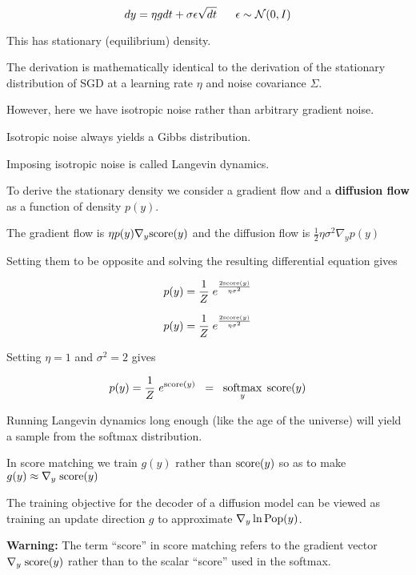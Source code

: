 {

$$dy =  \eta g dt + \sigma \epsilon \sqrt{dt}\;\;\;\;\;\; \epsilon \sim {\cal N}(0,I)$$

\vfill
This has stationary (equilibrium) density.

\vfill
The derivation is mathematically identical to the derivation of the stationary distribution of SGD at a learning rate $\eta$ and noise covariance $\Sigma$.

\vfill
However, here we have isotropic noise rather than arbitrary gradient noise.

\vfill
Isotropic noise always yields a Gibbs distribution.

\vfill
Imposing isotropic noise is called Langevin dynamics.



To derive the stationary density we consider a gradient flow and a {\bf diffusion flow} as a function of density $p(y)$.

\vfill
The gradient flow is $\eta p(y) \nabla_y \mathrm{score}(y)$ and the diffusion flow is $\frac{1}{2}\eta\sigma^2 \nabla_y p(y)$

\vfill
Setting them to be opposite and solving the resulting differential equation gives

\vfill
$$p(y)  = \frac{1}{Z}\;e^{\frac{2\mathrm{score}(y)}{\eta\sigma^2}}$$



$$p(y)  = \frac{1}{Z}\;e^{\frac{2\mathrm{score}(y)}{\eta\sigma^2}}$$

\vfill
Setting $\eta = 1$ and $\sigma^2 = 2$ gives

\vfill
$$p(y)  = \frac{1}{Z}\;e^{\mathrm{score}(y)} \;\;= \;\;\operatorname*{softmax}_y\;\mathrm{score}(y)$$

\vfill
Running Langevin dynamics long enough (like the age of the universe) will yield a sample from the softmax distribution.


In score matching we train $g(y)$ rather than $\mathrm{score}(y)$ so as to make $g(y) \approx \nabla_y \;\mathrm{score}(y)$

\vfill
The training objective for the decoder of a diffusion model can be viewed as training an update direction $g$
to approximate $\nabla_y \ln \mathrm{Pop}(y)$.

\vfill
{\bf Warning:} The term ``score'' in score matching refers to the gradient vector $\nabla_y\; \mathrm{score}(y)$ rather than to the scalar ``score'' used in the softmax.

}
